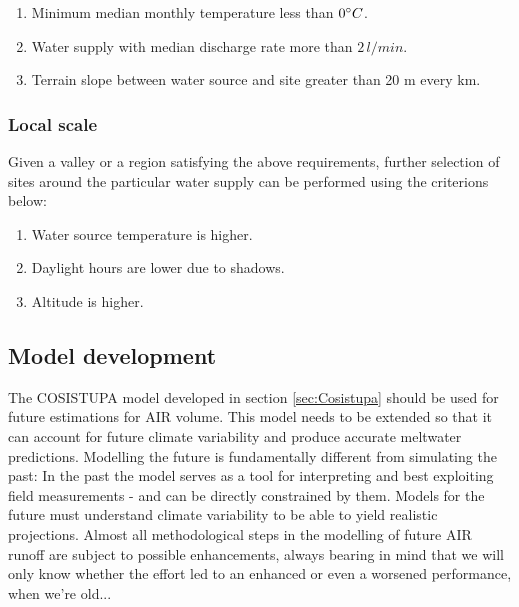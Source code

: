 \begin{enumerate}

	\item Minimum median monthly temperature less than $0 ^{\circ} C$.
	\item Water supply with median discharge rate more than $2\, l/min$.
	\item Terrain slope between water source and site greater than 20 m every km.

\end{enumerate}

\subsubsection{Local scale}

Given a valley or a region satisfying the above requirements, further selection of sites around the particular
water supply can be performed using the criterions below:

\begin{enumerate}
	\item Water source temperature is higher.
	\item Daylight hours are lower due to shadows.
	\item Altitude is higher.
\end{enumerate}

\subsection{Model development}

The COSISTUPA model developed in section \ref{sec:Cosistupa} should be used for future estimations for AIR
volume. This model needs to be extended so that it can account for future climate variability and produce
accurate meltwater predictions. Modelling the future is fundamentally different from simulating the past: In the
past the model serves as a tool for interpreting and best exploiting field measurements - and can be directly
constrained by them. Models for the future must understand climate variability to be able to yield realistic
projections. Almost all methodological steps in the modelling of future AIR runoff are subject to possible
enhancements, always bearing in mind that we will only know whether the effort led to an enhanced or even a
worsened performance, when we're old...

